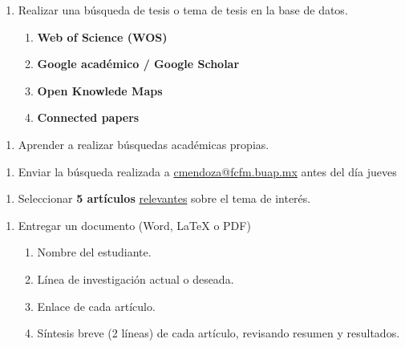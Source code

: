 \documentclass{article}
\begin{document}
\setlength{\columnsep}{2cm}
\begin{multicols}{2} 
\begin{enumerate}[label={{\textcolor{trueblue}{\textbf{Ej}. \arabic*.0}}}, start=1]
	\item Realizar una búsqueda de tesis o tema de tesis en la base de datos.
	\begin{enumerate}
		\item \textbf{Web of Science (WOS)}
		\item \textbf{Google académico / Google Scholar}
		\item \textbf{Open Knowlede Maps}
		\item \textbf{Connected papers}
	\end{enumerate}
\end{enumerate}

\begin{enumerate}[label={{\textcolor{trueblue}{\textbf{Ej}. \arabic*.0}}}, start=2]
	\item Aprender a realizar búsquedas académicas propias.
\end{enumerate}  

\begin{enumerate}[label={{\textcolor{trueblue}{\textbf{Ej}. \arabic*.0}}}, start=3]
	\item Enviar la búsqueda realizada a \href{cmendoza@fcfm.buap.mx}{cmendoza@fcfm.buap.mx} antes del día jueves
\end{enumerate} 

\begin{enumerate}[label={{\textcolor{trueblue}{\textbf{Ej}. \arabic*.0}}}, start=4]
	\item Seleccionar \textbf{5 artículos} \underline{relevantes} sobre el tema de interés.
\end{enumerate} 

\begin{enumerate}[label={{\textcolor{trueblue}{\textbf{Ej}. \arabic*.0}}}, start=5]
	\item Entregar un documento (Word, {\LaTeX} \hspace{1mm} o  PDF)
	\begin{enumerate}
		\item Nombre del estudiante.
		\item Línea de investigación actual o deseada.
		\item Enlace de cada artículo.
		\item Síntesis breve (2 líneas) de cada artículo, revisando resumen y resultados.
	\end{enumerate}
\end{enumerate} 

\end{multicols} 
\end{document}

